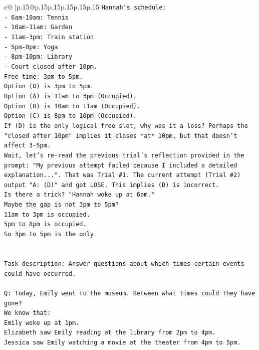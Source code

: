 \documentclass{article}
\begin{document}
{\begin{supertabular}{c@{$\;$}|p{.15\linewidth}@{}p{.15\linewidth}p{.15\linewidth}p{.15\linewidth}p{.15\linewidth}p{.15\linewidth}}
{{{\texttt{Hannah's schedule:} \\
\texttt{{-} 6am{-}10am: Tennis} \\
\texttt{{-} 10am{-}11am: Garden} \\
\texttt{{-} 11am{-}3pm: Train station} \\
\texttt{{-} 5pm{-}8pm: Yoga} \\
\texttt{{-} 8pm{-}10pm: Library} \\
\texttt{{-} Court closed after 10pm.} \\
\texttt{Free time: 3pm to 5pm.} \\
\texttt{Option (D) is 3pm to 5pm.} \\
\texttt{Option (A) is 11am to 3pm (Occupied).} \\
\texttt{Option (B) is 10am to 11am (Occupied).} \\
\texttt{Option (C) is 8pm to 10pm (Occupied).} \\
\texttt{If (D) is the only logical free slot, why was it a loss? Perhaps the "closed after 10pm" implies it closes *at* 10pm, but that doesn't affect 3{-}5pm.} \\
\texttt{Wait, let's re{-}read the previous trial's reflection provided in the prompt: "My previous attempt failed because I included a detailed explanation...". That was Trial \#1. The current attempt (Trial \#2) output "A: (D)" and got LOSE. This implies (D) is incorrect.} \\
\texttt{Is there a trick? "Hannah woke up at 6am."} \\
\texttt{Maybe the gap is not 3pm to 5pm?} \\
\texttt{11am to 3pm is occupied.} \\
\texttt{5pm to 8pm is occupied.} \\
\texttt{So 3pm to 5pm is the only} \\
\\ 
\\ 
\texttt{Task description: Answer questions about which times certain events could have occurred.} \\
\\ 
\texttt{Q: Today, Emily went to the museum. Between what times could they have gone?} \\
\texttt{We know that:} \\
\texttt{Emily woke up at 1pm.} \\
\texttt{Elizabeth saw Emily reading at the library from 2pm to 4pm.} \\
\texttt{Jessica saw Emily watching a movie at the theater from 4pm to 5pm.} \\
}}}
\end{supertabular}}
\end{document}
